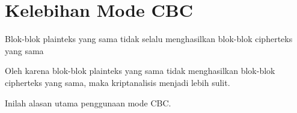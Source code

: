 \documentclass{article}
\begin{document}

\section*{Kelebihan Mode CBC}

Blok-blok plainteks yang sama tidak selalu menghasilkan blok-blok cipherteks yang sama

Oleh karena blok-blok plainteks yang sama tidak menghasilkan blok-blok cipherteks yang sama, maka kriptanalisis menjadi lebih sulit.

Inilah alasan utama penggunaan mode CBC.
\end{document}

